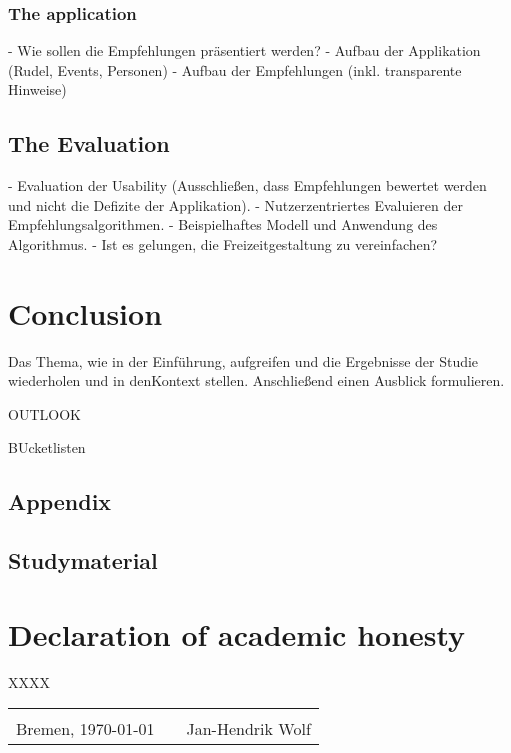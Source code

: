 \documentclass[12pt,numbers=noenddot,parskip,bibliography=totocnumbered,listof=totocnumbered]{scrreprt}
\begin{document}
\subsection{The application}
- Wie sollen die Empfehlungen präsentiert werden?
	- Aufbau der Applikation (Rudel, Events, Personen)
	- Aufbau der Empfehlungen (inkl. transparente Hinweise)
\section{The Evaluation}
- Evaluation der Usability (Ausschließen, dass Empfehlungen bewertet werden und nicht die Defizite der Applikation).
- Nutzerzentriertes Evaluieren der Empfehlungsalgorithmen.
- Beispielhaftes Modell und Anwendung des Algorithmus.
- Ist es gelungen, die Freizeitgestaltung zu vereinfachen?

\chapter{Conclusion}
Das Thema, wie in der Einführung, aufgreifen und die Ergebnisse der Studie wiederholen und in denKontext stellen. Anschließend einen Ausblick formulieren.

OUTLOOK

BUcketlisten

\begin{appendix} 
\chapter{Appendix}
\newpage
\section{Studymaterial}
\vspace*{\fill}
\label{lab:Studymaterial}
\vspace*{\fill}
\end{appendix}

\clearpage
{}



\listoffigures

\chapter*{Declaration of academic honesty}
\thispagestyle{empty}
XXXX
\begin{center}
\begin{tabular}{lp{2em}l} 
 \hspace{5cm}   && \hspace{4cm} \\\cline{1-1}\cline{3-3} 
 Bremen, \today    && Jan-Hendrik Wolf 
\end{tabular} 
\end{center}
\end{document}
